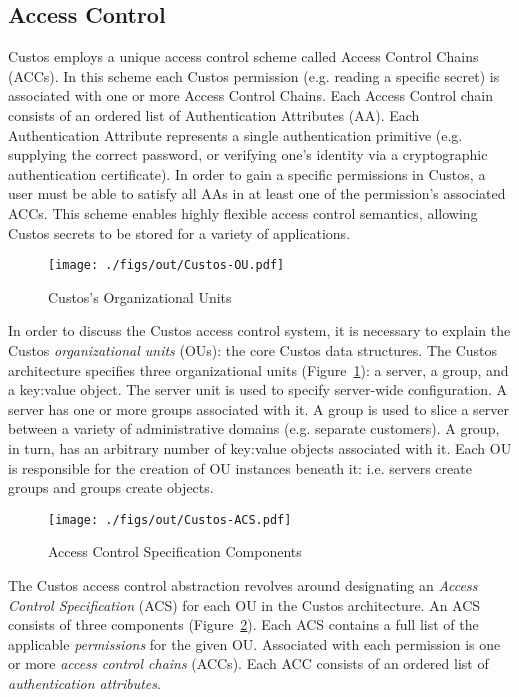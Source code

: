 \subsection{Access Control}
\label{chap:custos:arch:ac}

Custos employs a unique access control scheme called Access Control
Chains (ACCs). In this scheme each Custos permission (e.g. reading a
specific secret) is associated with one or more Access Control
Chains. Each Access Control chain consists of an ordered list of
Authentication Attributes (AA). Each Authentication Attribute
represents a single authentication primitive (e.g. supplying the
correct password, or verifying one's identity via a cryptographic
authentication certificate). In order to gain a specific permissions
in Custos, a user must be able to satisfy all AAs in at least one of
the permission's associated ACCs. This scheme enables highly flexible
access control semantics, allowing Custos secrets to be stored for a
variety of applications.

\begin{figure}[t]
  \centering
  \texttt{[image: ./figs/out/Custos-OU.pdf]}
  \caption{Custos's Organizational Units}
  \label{fig:custos-ou}
\end{figure}

In order to discuss the Custos access control system, it is necessary
to explain the Custos \emph{organizational units} (OUs): the core
Custos data structures. The Custos architecture specifies three
organizational units (Figure~\ref{fig:custos-ou}): a server, a group,
and a key:value object. The server unit is used to specify server-wide
configuration. A server has one or more groups associated with it. A
group is used to slice a server between a variety of administrative
domains (e.g. separate customers). A group, in turn, has an arbitrary
number of key:value objects associated with it. Each OU is responsible
for the creation of OU instances beneath it: i.e. servers create
groups and groups create objects.

\begin{figure}[t]
  \centering
  \texttt{[image: ./figs/out/Custos-ACS.pdf]}
  \caption{Access Control Specification Components}
  \label{fig:custos-acs}
\end{figure}

The Custos access control abstraction revolves around designating an
\emph{Access Control Specification} (ACS) for each OU in the Custos
architecture. An ACS consists of three components
(Figure~\ref{fig:custos-acs}). Each ACS contains a full list of the
applicable \emph{permissions} for the given OU. Associated with each
permission is one or more \emph{access control chains} (ACCs). Each
ACC consists of an ordered list of \emph{authentication attributes}.

